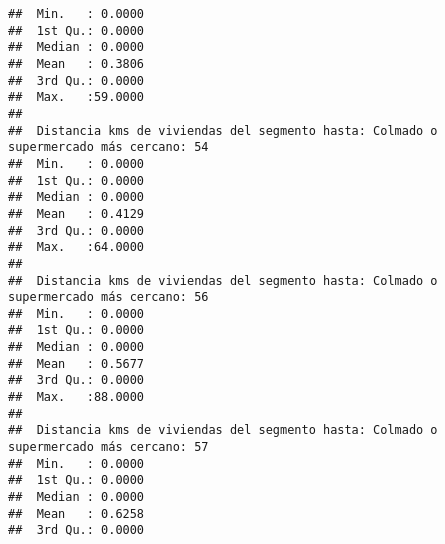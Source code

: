 \documentclass[11pt,]{article}
\begin{document}
\begin{verbatim}
##  Min.   : 0.0000                                                                      
##  1st Qu.: 0.0000                                                                      
##  Median : 0.0000                                                                      
##  Mean   : 0.3806                                                                      
##  3rd Qu.: 0.0000                                                                      
##  Max.   :59.0000                                                                      
##                                                                                       
##  Distancia kms de viviendas del segmento hasta: Colmado o supermercado más cercano: 54
##  Min.   : 0.0000                                                                      
##  1st Qu.: 0.0000                                                                      
##  Median : 0.0000                                                                      
##  Mean   : 0.4129                                                                      
##  3rd Qu.: 0.0000                                                                      
##  Max.   :64.0000                                                                      
##                                                                                       
##  Distancia kms de viviendas del segmento hasta: Colmado o supermercado más cercano: 56
##  Min.   : 0.0000                                                                      
##  1st Qu.: 0.0000                                                                      
##  Median : 0.0000                                                                      
##  Mean   : 0.5677                                                                      
##  3rd Qu.: 0.0000                                                                      
##  Max.   :88.0000                                                                      
##                                                                                       
##  Distancia kms de viviendas del segmento hasta: Colmado o supermercado más cercano: 57
##  Min.   : 0.0000                                                                      
##  1st Qu.: 0.0000                                                                      
##  Median : 0.0000                                                                      
##  Mean   : 0.6258                                                                      
##  3rd Qu.: 0.0000                                                                      

\end{verbatim}
\end{document}
